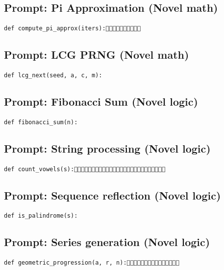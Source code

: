 
\subsection{Prompt: Pi Approximation (Novel math)}
\label{sec:appendix_pi_approximation__novel_math_}

\begin{verbatim}
def compute_pi_approx(iters):
\end{verbatim}


\subsection{Prompt: LCG PRNG (Novel math)}
\label{sec:appendix_lcg_prng__novel_math_}

\begin{verbatim}
def lcg_next(seed, a, c, m):
\end{verbatim}


\subsection{Prompt: Fibonacci Sum (Novel logic)}
\label{sec:appendix_fibonacci_sum__novel_logic_}

\begin{verbatim}
def fibonacci_sum(n):
\end{verbatim}


\subsection{Prompt: String processing (Novel logic)}
\label{sec:appendix_string_processing__novel_logic_}

\begin{verbatim}
def count_vowels(s):
\end{verbatim}


\subsection{Prompt: Sequence reflection (Novel logic)}
\label{sec:appendix_sequence_reflection__novel_logic_}

\begin{verbatim}
def is_palindrome(s):
\end{verbatim}


\subsection{Prompt: Series generation (Novel logic)}
\label{sec:appendix_series_generation__novel_logic_}

\begin{verbatim}
def geometric_progression(a, r, n):
\end{verbatim}


